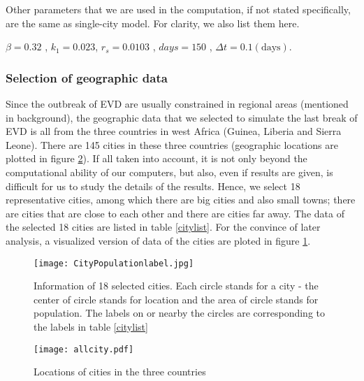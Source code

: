 Other parameters that we are used in the computation, if not stated specifically, are the same as single-city model. For clarity, we also list them here.

$\beta = 0.32$ , $k_1 = 0.023$, $r_s = 0.0103$ , $days = 150$ ,  $\Delta t = 0.1 (\text{days})$.

\subsubsection{Selection of geographic data}
Since the outbreak of EVD are usually constrained in regional areas (mentioned in background), the geographic data that we selected to simulate the last break of EVD is all from the three countries in west Africa (Guinea, Liberia and Sierra Leone). There are 145 cities in these three countries (geographic locations are plotted in figure \ref{allcity}). If all taken into account, it is not only beyond the computational ability of our computers, but also, even if results are given, is difficult for us to study the details of the results. Hence, we select 18 representative cities, among which there are big cities and also small towns; there are cities that are close to each other and there are cities far away. The data of the selected 18 cities are listed in table \ref{citylist}. For the convince of later analysis, a visualized version of data of the cities are ploted in figure \ref{cityplot}.

\begin{figure}
	\centering
	\texttt{[image: CityPopulationlabel.jpg]}
	\caption{Information of 18 selected cities. Each circle stands for a city - the center of circle stands for location and the area of circle stands for population. The labels on or nearby the circles are corresponding to the labels in table \ref{citylist}}
	\label{cityplot}
\end{figure}

\begin{figure}
	\centering
	\texttt{[image: allcity.pdf]}
	\caption{Locations of cities in the three countries}
	\label{allcity}
\end{figure}

